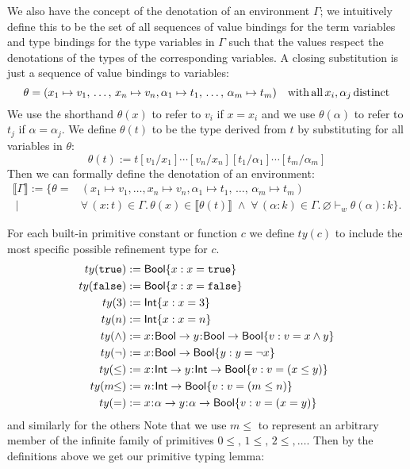 \documentclass[11pt]{article}
\newcommand{\al}{\alpha}
\newcommand{\bind}{\hspace{0.05em}{:}\hspace{0.05em}} %
\newcommand{\lb}{\llbracket}         %
\newcommand{\rb}{\rrbracket}         %
\newcommand{\true}{\mathtt{true}}
\newcommand{\Int}{{\sf Int}}
\newcommand{\Bool}{{\sf Bool}}
\begin{document}
We also have the concept of the denotation of an environment $\Gamma$; we intuitively define this to be the set of all sequences of value bindings for the term variables and type bindings for the type variables in $\Gamma$ such that the values respect the denotations of the types of the corresponding variables.
A closing substitution is just a sequence of value bindings to variables:
\[
\theta = (x_1\mapsto v_1,\,\ldots,\, x_n\mapsto v_n, \al_1 \mapsto t_1, \,\ldots,\, \al_m\mapsto t_m)
\quad {\rm with\, all}\, x_i, \al_j\, {\rm distinct}
\]
We use the shorthand $\theta(x)$ to refer to $v_i$ if $x = x_i$ and we use $\theta(\al)$ to refer to $t_j$ if $\al = \al_j$. We define $\theta(t)$ to be the type derived from $t$ by substituting for all variables in $\theta$:
\[
\theta(t) := t[v_1/x_1]\cdots[v_n/x_n][t_1/\al_1]\cdots[t_m/\al_m]
\]
Then we can formally define the denotation of an environment:
\begin{align*}
\lb \Gamma \rb := \{ \theta =& (x_1 \mapsto v_1,\ldots, x_n \mapsto v_n,  \al_1 \mapsto t_1, \,\ldots,\, \al_m\mapsto t_m) \\ \; | \;&
\forall\, (x:t) \in \Gamma.\, \theta(x) \in \lb\theta(t)\rb \;\wedge\;
\forall\, (\al:k) \in \Gamma.\, \varnothing \vdash_w \theta(\al) : k \}.
\end{align*}

For each built-in primitive constant or function $c$ we define $ty(c)$ to include the most specific possible refinement type for $c$.
\begin{align*}
ty(\true) :=&\; \Bool\{ x : x = \true \}\\
ty({\tt false}) :=&\; \Bool\{ x : x = {\tt false}\}\\
ty(3) :=&\; \Int\{ x : x = 3\} \\
ty(n) :=&\; \Int\{ x : x = n\} \\
ty(\wedge) :=&\; 	x\bind\Bool \rightarrow y\bind\Bool \rightarrow \Bool\{ v : v = x \wedge y\}\\
ty(\neg) :=&\; x\bind\Bool \rightarrow \Bool\{ y : y = \neg x\}\\
ty(\leq) :=&\; x\bind\Int \rightarrow y\bind\Int \rightarrow \Bool\{v : v = (x \leq y)\}\\
ty(m\!\!\leq) :=&\; n\bind\Int \rightarrow \Bool\{v : v = (m \leq n)\}\\
ty(=) :=&\; x\bind\al \rightarrow y\bind\al \rightarrow \Bool\{ v : v = (x = y) \} 
\end{align*}
and similarly for the others %
Note that we use $m\!\!\leq$ to represent an arbitrary member of the infinite family of primitives $0\!\!\leq,\, 1\!\!\leq,\, 2\!\!\leq,\ldots$. Then by the definitions above we get our primitive typing lemma:
\end{document}
